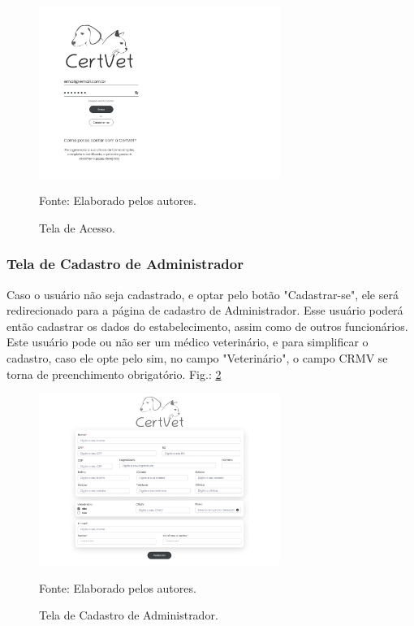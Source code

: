 \documentclass[
    12pt,               %
    openright,          %
    oneside,
    a4paper,            %
    BIBLATEX,           %
    TODO,               %
    english,            %
    brazil              %
    ]{ifsp-spo-inf-ctds}
\begin{document}
 \begin{figure}[H]
                \centering
                \caption{Tela de Acesso.}
                \includegraphics[width=0.7\textwidth]{images/Telas/cadastro.png}
                
                \label{fig:Acesso}
                \centering
        {\footnotesize Fonte: Elaborado pelos autores.}
            \end{figure}

\subsubsection{Tela de Cadastro de Administrador}

Caso o usuário não seja cadastrado, e optar pelo botão "Cadastrar-se", ele será redirecionado para a página de cadastro de Administrador. Esse usuário poderá então cadastrar os dados do estabelecimento, assim como de outros funcionários. Este usuário pode ou não ser um médico veterinário, e para simplificar o cadastro, caso ele opte pelo sim, no campo "Veterinário", o campo CRMV se torna de preenchimento obrigatório. Fig.: \ref{fig:CadAdmin}

\begin{figure}[H]
                \centering
                \caption{Tela de Cadastro de Administrador.}
                \includegraphics[width=0.7\textwidth]{images/Telas/Pagina cadastro - ADMIN.png}
                
                \label{fig:CadAdmin}
                \centering
        {\footnotesize Fonte: Elaborado pelos autores.}
            \end{figure}
\end{document}
